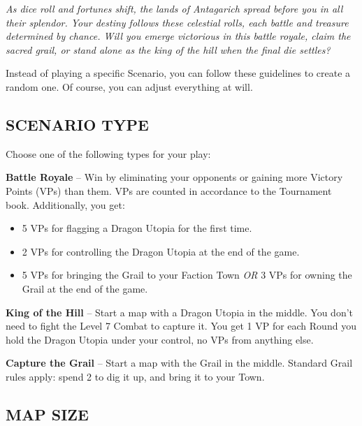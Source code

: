 
\begin{multicols*}{2}

\textit{As dice roll and fortunes shift, the lands of Antagarich spread before you in all their splendor.
  Your destiny follows these celestial rolls, each battle and treasure determined by chance.
  Will you emerge victorious in this battle royale, claim the sacred grail, or stand alone as the king of the hill when the final die settles?  %
}

Instead of playing a specific Scenario, you can follow these guidelines to create a random one.
Of course, you can adjust everything at will.

\subsection*{\MakeUppercase{Scenario Type}}

Choose one of the following types for your play:

\textbf{Battle Royale} -- Win by eliminating your opponents or gaining more Victory Points (VPs) than them.
VPs are counted in accordance to the Tournament book.
Additionally, you get:
\begin{itemize}
  \item 5 VPs for flagging a Dragon Utopia for the first time.
  \item 2 VPs for controlling the Dragon Utopia at the end of the game.
  \item 5 VPs for bringing the Grail to your Faction Town \textit{OR} 3 VPs for owning the Grail  at the end of the game.
\end{itemize}

\textbf{King of the Hill} -- Start a map with a Dragon Utopia in the middle.
You don't need to fight the Level 7 Combat to capture it.
You get 1 VP for each Round you hold the Dragon Utopia under your control, no VPs from anything else.

\textbf{Capture the Grail} -- Start a map with the Grail in the middle.
Standard Grail rules apply: spend 2  to dig it up, and bring it to your Town.
\vspace*{\fill}
\columnbreak

\subsection*{\MakeUppercase{Map Size}}


\end{multicols*}
